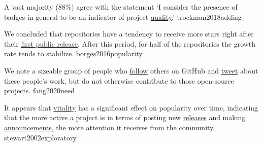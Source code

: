 \documentclass{article}
\begin{document}
  {A vast majority (88\%) agree with the statement `I consider the presence of badges in general to be an indicator of project \ul{quality}.'}
  {trockman2018adding}


  {We concluded that repositories have a tendency to receive more stars right after their \ul{first public release}. After this period, for half of the repositories the growth rate tends to stabilize.}
  {borges2016popularity}

  {We note a sizeable group of people who \ul{follow} others on GitHub and \ul{tweet} about these people’s work, but do not otherwise contribute to those open-source projects.}
  {fang2020need}


  {It appears that \ul{vitality} has a significant effect on popularity over time, indicating that the more active a project is in terms of posting new \ul{releases} and making \ul{announcements}, the more attention it receives from the community.}
  {stewart2002exploratory}
\end{document}
